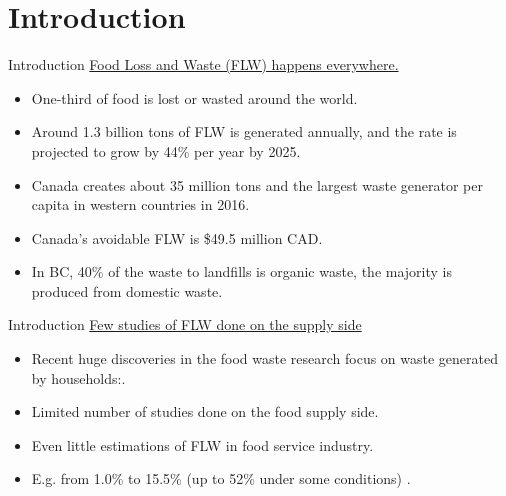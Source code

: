\documentclass{beamer}
\begin{document}
\section{Introduction}
\begin{frame}{Introduction}
    \underline{Food Loss and Waste (FLW) happens everywhere.}
    \begin{itemize}
        \item One-third of food is lost or wasted around the world\cite{Gustavsson2011-em}.
        \item Around 1.3 billion tons of FLW is generated annually, and the rate is projected to grow by 44\% per year by 2025\cite{Blakeney2019-jk}.
    \end{itemize}
    \begin{itemize}
        \item Canada creates about 35 million tons and the largest waste generator per capita in western countries in 2016\cite{Nzwc2016-jl}.
        \item Canada's avoidable FLW is \$49.5 million CAD\cite{Gooch2019-gd}.
    \end{itemize}
    \begin{itemize}
        \item In BC, 40\% of the waste to landfills is organic waste, the majority is produced from domestic waste\cite{BCwaste}.
    \end{itemize}
\end{frame}

\begin{frame}{Introduction}
    \underline{Few studies of FLW done on the supply side}
    \begin{itemize}
        \item Recent huge discoveries in the food waste research focus on waste generated by households:\cite{Aschemann-Witzel2015-xj,Lusk2017-xm,Von_Massow2019-qa}.
    \end{itemize}

    \begin{itemize}
        \item Limited number of studies done on the food supply side.
        \item Even little estimations of FLW in food service industry.
        \item E.g. from 1.0\% to 15.5\% (up to 52\% under some conditions) \cite{Ministry_of_Environment_And_Climate_Change_Strategy2018-sk}. 
    \end{itemize}
\end{frame}
\end{document}
